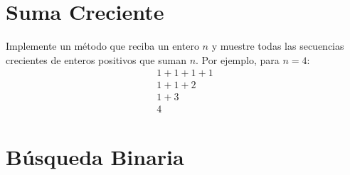 \section{Suma Creciente}  
Implemente un método que reciba un entero \( n \) y muestre todas las secuencias crecientes de enteros positivos que suman \( n \). Por ejemplo, para \( n = 4 \):  
\begin{equation}
    \begin{aligned}
    1+1+1+1 \\
    1+1+2 \\
    1+3 \\
    4
    \end{aligned}
\end{equation}

\section{Búsqueda Binaria}  
  






% 

